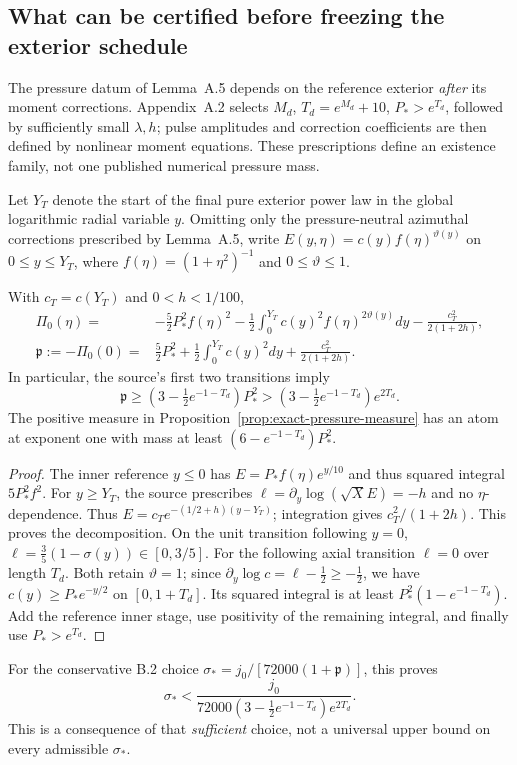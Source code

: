 \subsection*{What can be certified before freezing the exterior schedule}
\label{subsec:stagewise-pressure-enclosure}
The pressure datum of Lemma~A.5 depends on the reference exterior
\emph{after} its moment corrections. Appendix~A.2 selects $M_d$,
$T_d=e^{M_d}+10$, $P_*>e^{T_d}$, followed by sufficiently small
$\lambda,h$; pulse amplitudes and correction coefficients are then
defined by nonlinear moment equations. These prescriptions define
an existence family, not one published numerical pressure mass.

Let $Y_T$ denote the start of the final pure exterior power law
in the global logarithmic radial variable $y$. Omitting only the
pressure-neutral azimuthal corrections prescribed by Lemma~A.5,
write $E(y,\eta)=c(y)f(\eta)^{\vartheta(y)}$ on $0\le y\le Y_T$,
where $f(\eta)=(1+\eta^2)^{-1}$ and $0\le\vartheta\le1$.

\begin{proposition}
\label{prop:source-pressure-finite-tail}
With $c_T=c(Y_T)$ and $0<h<1/100$,
\begin{align}
\Pi_0(\eta)={}&-\frac52P_*^2f(\eta)^2
-\frac12\int_0^{Y_T}c(y)^2f(\eta)^{2\vartheta(y)}dy
-\frac{c_T^2}{2(1+2h)},\label{eq:pressure-finite-decomp}\\
\mathfrak p:=-\Pi_0(0)={}&\frac52P_*^2+
\frac12\int_0^{Y_T}c(y)^2dy+\frac{c_T^2}{2(1+2h)}.
\label{eq:pressure-mass-decomp}
\end{align}
In particular, the source's first two transitions imply
\begin{equation}\label{eq:source-early-mass}
\mathfrak p\ge (3-\tfrac12e^{-1-T_d})P_*^2
>(3-\tfrac12e^{-1-T_d})e^{2T_d}.
\end{equation}
The positive measure in Proposition~\ref{prop:exact-pressure-measure}
has an atom at exponent one with mass at least
$(6-e^{-1-T_d})P_*^2$.
\end{proposition}
\begin{proof}
The inner reference $y\le0$ has
$E=P_*f(\eta)e^{y/10}$ and thus squared integral
$5P_*^2f^2$. For $y\ge Y_T$, the source prescribes
$\ell=\partial_y\log(\sqrt X E)=-h$ and no $\eta$-dependence.
Thus $E=c_Te^{-(1/2+h)(y-Y_T)}$; integration gives
$c_T^2/(1+2h)$. This proves the decomposition.
On the unit transition following $y=0$,
$\ell=\frac35(1-\sigma(y))\in[0,3/5]$.
For the following axial transition $\ell=0$ over length $T_d$.
Both retain $\vartheta=1$; since
$\partial_y\log c=\ell-\tfrac12\ge-\tfrac12$,
we have $c(y)\ge P_*e^{-y/2}$ on $[0,1+T_d]$.
Its squared integral is at least
$P_*^2(1-e^{-1-T_d})$.
Add the reference inner stage, use positivity of the remaining
integral, and finally use $P_*>e^{T_d}$.
\end{proof}
For the conservative B.2 choice
$\sigma_*=j_0/[72000(1+\mathfrak p)]$,
this proves
\[
\sigma_*<
\frac{j_0}{72000(3-\frac12e^{-1-T_d})e^{2T_d}}.
\]
This is a consequence of that \emph{sufficient} choice, not a
universal upper bound on every admissible $\sigma_*$.

